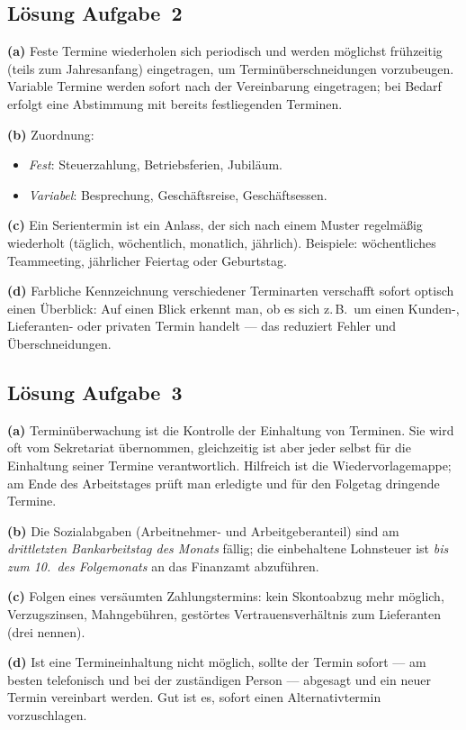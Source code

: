 \documentclass[11pt, a4paper]{article}
\begin{document}
\subsection*{Lösung Aufgabe~2}
\begin{loesung}
\textbf{(a)} Feste Termine wiederholen sich periodisch und werden möglichst frühzeitig
(teils zum Jahresanfang) eingetragen, um Terminüberschneidungen vorzubeugen. Variable
Termine werden sofort nach der Vereinbarung eingetragen; bei Bedarf erfolgt eine
Abstimmung mit bereits festliegenden Terminen.

\textbf{(b)} Zuordnung:
\begin{itemize}[itemsep=0pt]
  \item \emph{Fest}: Steuerzahlung, Betriebsferien, Jubiläum.
  \item \emph{Variabel}: Besprechung, Geschäftsreise, Geschäftsessen.
\end{itemize}

\textbf{(c)} Ein Serientermin ist ein Anlass, der sich nach einem Muster regelmäßig
wiederholt (täglich, wöchentlich, monatlich, jährlich). Beispiele: wöchentliches
Teammeeting, jährlicher Feiertag oder Geburtstag.

\textbf{(d)} Farbliche Kennzeichnung verschiedener Terminarten verschafft sofort optisch
einen Überblick: Auf einen Blick erkennt man, ob es sich z.\,B.\ um einen Kunden-,
Lieferanten- oder privaten Termin handelt --- das reduziert Fehler und Überschneidungen.
\end{loesung}

\subsection*{Lösung Aufgabe~3}
\begin{loesung}
\textbf{(a)} Terminüberwachung ist die Kontrolle der Einhaltung von Terminen. Sie wird
oft vom Sekretariat übernommen, gleichzeitig ist aber jeder selbst für die Einhaltung
seiner Termine verantwortlich. Hilfreich ist die Wiedervorlagemappe; am Ende des
Arbeitstages prüft man erledigte und für den Folgetag dringende Termine.

\textbf{(b)} Die Sozialabgaben (Arbeitnehmer- und Arbeitgeberanteil) sind am
\emph{drittletzten Bankarbeitstag des Monats} fällig; die einbehaltene Lohnsteuer ist
\emph{bis zum 10.\ des Folgemonats} an das Finanzamt abzuführen.

\textbf{(c)} Folgen eines versäumten Zahlungstermins: kein Skontoabzug mehr möglich,
Verzugszinsen, Mahngebühren, gestörtes Vertrauensverhältnis zum Lieferanten (drei
nennen).

\textbf{(d)} Ist eine Termineinhaltung nicht möglich, sollte der Termin sofort --- am
besten telefonisch und bei der zuständigen Person --- abgesagt und ein neuer Termin
vereinbart werden. Gut ist es, sofort einen Alternativtermin vorzuschlagen.
\end{loesung}
\end{document}
